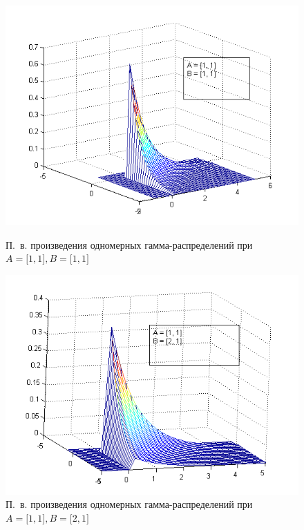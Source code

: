 \begin{figure}[h!]
  \begin{minipage}[h!]{0.47\linewidth}
    \includegraphics[width=1\linewidth]{pic/new/gamma_mesh_1}
    \caption{П.~в. произведения одномерных гамма-распределений при 
    $ A = \big[1, 1\big], B = \big[ 1, 1 \big] $
    }\label{pic:gamma_mesh_start}
  \end{minipage}
  \hfill
  \begin{minipage}[h!]{0.47\linewidth}
    \includegraphics[width=1\linewidth]{pic/new/gamma_mesh_2}
    \caption{П.~в. произведения одномерных гамма-распределений при 
      $ A = \big[1, 1\big], B = \big[ 2, 1 \big] $}
  \end{minipage}
\end{figure}

